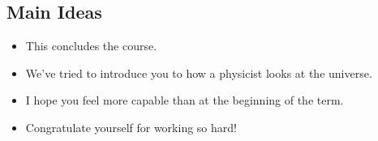 \documentclass[]{article}
\begin{document}
\newpage
\begin{TeacherMargin}
	
\end{TeacherMargin}
\begin{PresentSpace}
\section*{Main Ideas}
\begin{itemize}
	\item This concludes the course.
	\item We've tried to introduce you to how a physicist looks at the universe.
	\item I hope you feel more capable than at the beginning of the term.
	\item Congratulate yourself for working so hard!
\end{itemize}
\end{PresentSpace}
\end{document}

